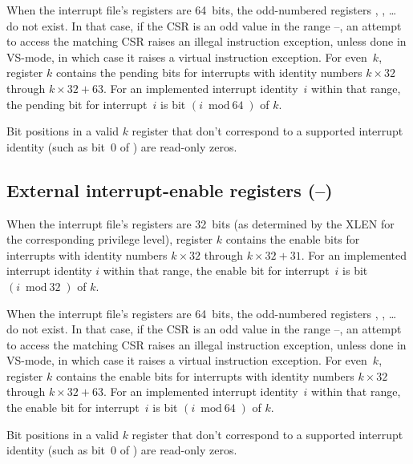 When the interrupt file's registers are 64~bits, the odd-numbered
registers , , \dots {} do not exist.
In that case, if the  CSR is an odd value in the range
--, an attempt to access the matching  CSR
raises an illegal instruction exception, unless done in VS-mode, in
which case it raises a virtual instruction exception.
For even~$k$, register $k$ contains the pending bits
for interrupts with identity numbers $k\times\mbox{32}$ through
${k\times\mbox{32} + \mbox{63}}$.
For an implemented interrupt identity~$i$ within that range, the
pending bit for interrupt~$i$ is bit $(i\bmod\mbox{64})$ of $k$.

Bit positions in a valid $k$ register that don't correspond
to a supported interrupt identity (such as bit~0 of ) are
read-only zeros.

\subsection{External interrupt-enable registers (--)}

When the interrupt file's registers are 32~bits (as determined by
the XLEN for the corresponding privilege level), register $k$
contains the enable bits for interrupts with identity numbers
$k\times\mbox{32}$ through ${k\times\mbox{32} + \mbox{31}}$.
For an implemented interrupt identity $i$ within that range, the enable
bit for interrupt~$i$ is bit $(i\bmod\mbox{32})$ of $k$.

When the interrupt file's registers are 64~bits, the odd-numbered
registers , , \dots {} do not exist.
In that case, if the  CSR is an odd value in the range
--, an attempt to access the matching  CSR
raises an illegal instruction exception, unless done in VS-mode, in
which case it raises a virtual instruction exception.
For even~$k$, register $k$ contains the enable bits for
interrupts with identity numbers $k\times\mbox{32}$ through
${k\times\mbox{32} + \mbox{63}}$.
For an implemented interrupt identity~$i$ within that range, the enable
bit for interrupt~$i$ is bit $(i\bmod\mbox{64})$ of $k$.

Bit positions in a valid $k$ register that don't correspond
to a supported interrupt identity (such as bit~0 of ) are
read-only zeros.

